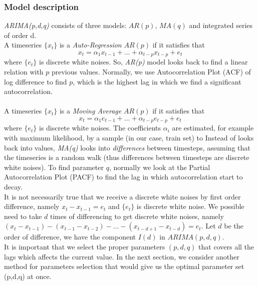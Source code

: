 \documentclass[11pt]{article}
\begin{document}
\subsubsection{Model description}
\textit{ARIMA(p,d,q)} consists of three models: $AR(p)$, $MA(q)$ and integrated
series of order d.\\ 
A timeseries $\{x_t\}$ is a \textit{Auto-Regression} $AR(p)$ if it satisfies that
$$
x_t = \alpha_1x_{t-1} + \ldots + \alpha_{t-p}x_{t-p} + e_t 
$$
where $\{e_t\}$ is discrete white noises. So, \textit{AR(p)} model looks back to
find a linear relation with $p$ previous values. Normally, we use
Autocorrelation Plot (ACF) of log difference to find $p$, which is the highest
lag in which we find a significant autocorrelation.\\
\\
A timeseries $\{x_t\}$ is a \textit{Moving Average} $AR(p)$ if it satisfies that
$$
x_t = \alpha_1e_{t-1} + \ldots + \alpha_{t-p}e_{t-p} + e_t 
$$
where $\{e_t\}$ is discrete white noises. The coefficients $\alpha_i$ are
estimated, for example with maximum likelihood, by a sample (in our case, train
set) to Instead of looks back into values, \textit{MA(q)} looks into
\textit{differences} between timesteps, assuming that the timeseries is a random
walk (thus differences between timesteps are discrete white noises). To find
parameter $q$, normally we look at the Partial Autocorrelation Plot (PACF) to
find the lag in which autocorrelation start to decay.\\
It is not necessarily true that  we receive a discrete white noises by first
order difference, namely $x_t - x_{t-1}=e_t$ and $\{e_t\}$ is discrete white
noise. We possible need to take $d$ times of differencing to get discrete white
noises, namely $(x_t-x_{t-1})-(x_{t-1}-x_{t-2})-\ldots-(x_{t-d+1}-x_{t-d})=e_t$.
Let $d$ be the order of difference, we have the component $I(d)$ in
$ARIMA(p,d,q)$.\\ 

It is important that we select the proper parameters $(p,d,q)$ that covers all
the lags which affects the current value. In the next section, we consider
another method for parameters selection that would give us the optimal parameter
set (p,d,q) at once.
\end{document}
